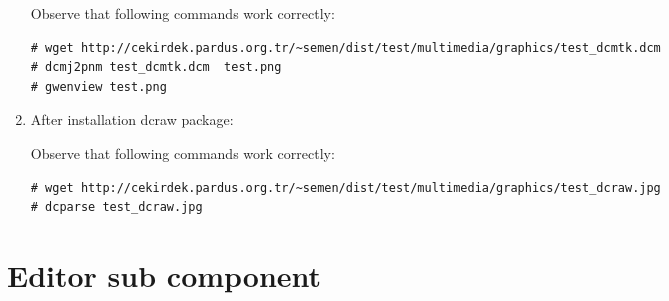 \documentclass[a4paper,10pt]{article}
\begin{document}
\begin{enumerate}
Observe that following commands work correctly:
\begin{verbatim}
# wget http://cekirdek.pardus.org.tr/~semen/dist/test/multimedia/graphics/test_dcmtk.dcm 
# dcmj2pnm test_dcmtk.dcm  test.png
# gwenview test.png
\end{verbatim}

\item After installation dcraw package:

Observe that following commands work correctly:
\begin{verbatim}
# wget http://cekirdek.pardus.org.tr/~semen/dist/test/multimedia/graphics/test_dcraw.jpg 
# dcparse test_dcraw.jpg 
\end{verbatim}

\end{enumerate}

\section{Editor sub component}
\end{document}
